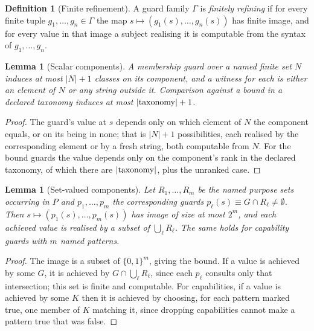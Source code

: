\documentclass[11pt,a4paper]{article}
\theoremstyle{plain}
\newtheorem{lemma}[theorem]{Lemma}
\theoremstyle{definition}
\newtheorem{definition}[theorem]{Definition}
\theoremstyle{remark}
\begin{document}
\begin{definition}[Finite refinement]
\label{def:refining}
A guard family $\Gamma$ is \emph{finitely refining} if for every finite tuple
$g_1,\dots,g_n \in \Gamma$ the map $s \mapsto (g_1(s),\dots,g_n(s))$ has finite image, and
for every value in that image a subject realising it is computable from the syntax of
$g_1,\dots,g_n$.
\end{definition}

\begin{lemma}[Scalar components]
\label{lem:scalar}
A membership guard over a named finite set $N$ induces at most $|N| + 1$ classes on its
component, and a witness for each is either an element of $N$ or any string outside it.
Comparison against a bound in a declared taxonomy induces at most $|{\rm taxonomy}| + 1$.
\end{lemma}

\begin{proof}
The guard's value at $s$ depends only on which element of $N$ the component equals, or on
its being in none; that is $|N| + 1$ possibilities, each realised by the corresponding
element or by a fresh string, both computable from $N$. For the bound guards the value
depends only on the component's rank in the declared taxonomy, of which there are
$|{\rm taxonomy}|$, plus the unranked case.
\end{proof}

\begin{lemma}[Set-valued components]
\label{lem:setvalued}
Let $R_1,\dots,R_m$ be the named purpose sets occurring in $P$ and $p_1,\dots,p_m$ the
corresponding guards $p_\ell(s) \equiv G \cap R_\ell \neq \emptyset$. Then
$s \mapsto (p_1(s),\dots,p_m(s))$ has image of size at most $2^m$, and each achieved value
is realised by a subset of $\bigcup_\ell R_\ell$. The same holds for capability guards with
$m$ named patterns.
\end{lemma}

\begin{proof}
The image is a subset of $\{0,1\}^m$, giving the bound. If a value is achieved by some $G$,
it is achieved by $G \cap \bigcup_\ell R_\ell$, since each $p_\ell$ consults only that
intersection; this set is finite and computable. For capabilities, if a value is achieved by
some $K$ then it is achieved by choosing, for each pattern marked true, one member of $K$
matching it, since dropping capabilities cannot make a pattern true that was false.
\end{proof}
\end{document}
